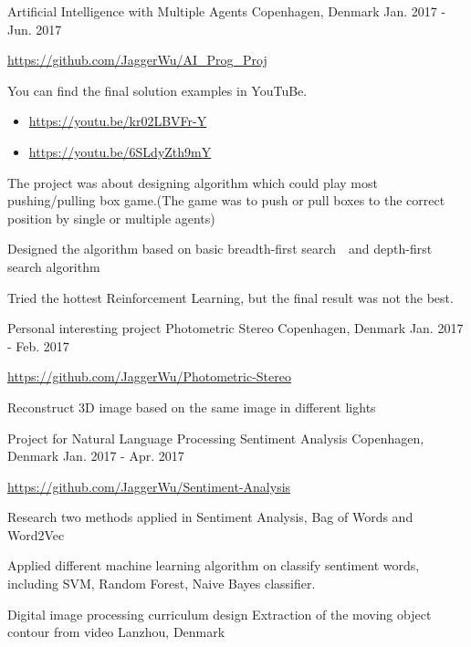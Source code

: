 \begin{cventries}
    {Artificial Intelligence with Multiple Agents}
    {Copenhagen, Denmark}
    {Jan. 2017 - Jun. 2017}
    {
      \begin{cvitems}
        \item {\url{https://github.com/JaggerWu/AI_Prog_Proj}}
        \item {You can find the final solution examples in YouTuBe.
        \begin{itemize}
            \item \url{https://youtu.be/kr02LBVFr-Y}
            \item \url{https://youtu.be/6SLdyZth9mY}
        \end{itemize}}
        \item {The project was about designing algorithm which could play most pushing/pulling box game.(The game was to push or pull boxes to the correct position by single or multiple agents)}
        \item {Designed the algorithm based on basic breadth-first search　and depth-first search algorithm}
        \item {Tried the hottest Reinforcement Learning, but the final result was not the best.}
      \end{cvitems}
    }
  \cventry
    {Personal interesting project}
    {Photometric Stereo}
    {Copenhagen, Denmark}
    {Jan. 2017 - Feb. 2017}
    {
      \begin{cvitems}
        \item {\url{https://github.com/JaggerWu/Photometric-Stereo}}
        \item {Reconstruct 3D image based on the same image in different lights}
      \end{cvitems} 
    }
  \cventry
    {Project for Natural Language Processing}
    {Sentiment Analysis}
    {Copenhagen, Denmark}
    {Jan. 2017 - Apr. 2017}
    {
      \begin{cvitems}
        \item {\url{https://github.com/JaggerWu/Sentiment-Analysis}}
        \item {Research two methods applied in Sentiment Analysis, Bag of Words and Word2Vec}
        \item {Applied different machine learning algorithm on classify sentiment words, including SVM, Random Forest, Naive Bayes classifier.}
      \end{cvitems} 
    }
  \cventry
    {Digital image processing curriculum design}
    {Extraction of  the moving object contour from video}
    {Lanzhou, Denmark}

\end{cventries}
